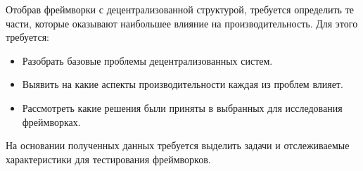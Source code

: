 Отобрав фреймворки с децентрализованной структурой, требуется определить те части, которые оказывают наибольшее влияние на производительность. Для этого требуется:
\begin{itemize}
	\item Разобрать базовые проблемы децентрализованных систем.
	\item Выявить на какие аспекты производительности каждая из проблем влияет.
	\item Рассмотреть какие решения были приняты в выбранных для исследования фреймворках.
\end{itemize}

На основании полученных данных требуется выделить задачи и отслеживаемые характеристики для тестирования фреймворков. 